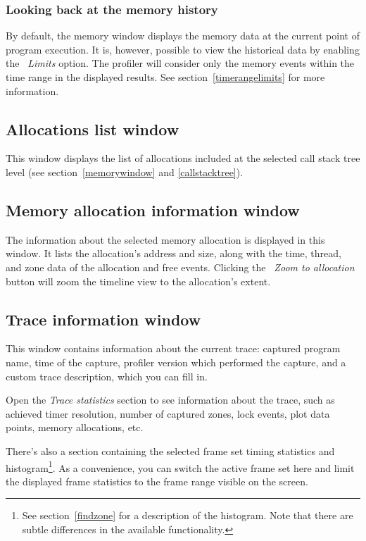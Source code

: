 \documentclass[hidelinks,titlepage,a4paper]{article}
\begin{document}
\subsubsection{Looking back at the memory history}

By default, the memory window displays the memory data at the current point of program execution. It is, however, possible to view the historical data by enabling the \emph{\faRuler{}~Limits} option. The profiler will consider only the memory events within the time range in the displayed results. See section~\ref{timerangelimits} for more information.

\subsection{Allocations list window}
\label{alloclist}

This window displays the list of allocations included at the selected call stack tree level (see section~\ref{memorywindow} and \ref{callstacktree}).

\subsection{Memory allocation information window}
\label{memallocinfo}

The information about the selected memory allocation is displayed in this window. It lists the allocation's address and size, along with the time, thread, and zone data of the allocation and free events. Clicking the \emph{\faMicroscope{}~Zoom to allocation} button will zoom the timeline view to the allocation's extent.

\subsection{Trace information window}
\label{traceinfo}

This window contains information about the current trace: captured program name, time of the capture, profiler version which performed the capture, and a custom trace description, which you can fill in.

Open the \emph{Trace statistics} section to see information about the trace, such as achieved timer resolution, number of captured zones, lock events, plot data points, memory allocations, etc.

There's also a section containing the selected frame set timing statistics and histogram\footnote{See section~\ref{findzone} for a description of the histogram. Note that there are subtle differences in the available functionality.}. As a convenience, you can switch the active frame set here and limit the displayed frame statistics to the frame range visible on the screen.
\end{document}
